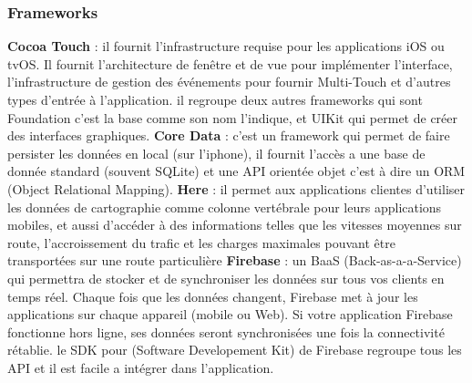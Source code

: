 \subsubsection{Frameworks} %
\label{ssub:subsubsection_name}
\begin{itemize}
	\itemb \textbf{Cocoa Touch} : il fournit l'infrastructure requise pour les applications iOS ou tvOS. Il fournit l'architecture de fenêtre et de vue pour implémenter l'interface, l'infrastructure de gestion des événements pour fournir Multi-Touch et d'autres types d'entrée à l'application.
	il regroupe deux autres frameworks qui sont Foundation c'est la base comme son nom l'indique, et UIKit
	qui permet de créer des interfaces graphiques.
	\itemb \textbf{Core Data} : c'est un framework qui permet de faire persister les données en local (sur l'iphone), il fournit l’accès a une base de donnée standard (souvent SQLite) et une API orientée objet c'est à dire un ORM (Object Relational Mapping).
	\itemb \textbf{Here} : il permet aux applications clientes d'utiliser les données de cartographie comme colonne vertébrale pour leurs applications mobiles, et aussi d'accéder à des informations telles que les vitesses moyennes sur route, l'accroissement du trafic et les charges maximales pouvant être transportées sur une route particulière
	\itemb \textbf{Firebase} : un BaaS (Back-as-a-a-Service) qui permettra de stocker et de synchroniser les données sur tous vos clients en temps réel. Chaque fois que les données changent, Firebase met à jour les applications sur chaque appareil (mobile ou Web). Si votre application Firebase fonctionne hors ligne, ses données seront synchronisées une fois la connectivité rétablie.\newline
	le SDK pour (Software Developement Kit) de Firebase regroupe tous les API et il est facile a intégrer dans l'application.
\end{itemize}

